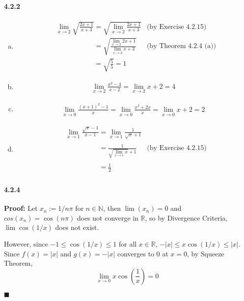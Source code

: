 \documentclass[11pt]{article}
\newcommand{\qed}{
	\begin{flushright}
		$\blacksquare$
	\end{flushright}}
\begin{document}
	\paragraph{4.2.2}
		\begin{enumerate}[(a)]
			\item 
			\begin{align}
				&\lim_{x \rightarrow 2} \sqrt{\frac{2x + 1}{x + 3}} = \sqrt{\lim_{x \rightarrow 2} \frac{2x+1}{x+3}} & \text{(by Exercise 4.2.15)}\nonumber\\
				&\phantom{\lim_{x \rightarrow 2} \sqrt{\frac{2x + 1}{x + 3}}} = \sqrt{\frac{\lim_{x \rightarrow 2} 2x + 1}{\lim_{x \rightarrow 2} x + 3}} & \text{(by Theorem 4.2.4 (a))}\nonumber\\
				&\phantom{\lim_{x \rightarrow 2} \sqrt{\frac{2x + 1}{x + 3}}} = \sqrt{\frac{5}{5}} = 1\nonumber
			\end{align}
			\item
			\begin{align}
				\lim_{x \rightarrow 2} \frac{x^2 - 4}{x - 2} = \lim_{x \rightarrow 2} x + 2 = 4 \nonumber
			\end{align}
			\item
			\begin{align}
				\lim_{x\rightarrow 0} \frac{(x + 1)^2 - 1}{x} = \lim_{x\rightarrow 0} \frac{x^2 + 2x}{x} = \lim_{x\rightarrow 0} x + 2 = 2 \nonumber
			\end{align}
			\item
			\begin{align}
				&\lim_{x\rightarrow 1} \frac{\sqrt{x} - 1}{x - 1} = \lim_{x\rightarrow 1}\frac{1}{\sqrt{x} + 1}\nonumber\\
				&\phantom{\lim_{x\rightarrow 1} \frac{\sqrt{x} - 1}{x - 1}} = \frac{1}{\sqrt{\lim_{x \rightarrow 1}x} + 1} &\text{(by Exercise 4.2.15)}\nonumber\\
				&\phantom{\lim_{x\rightarrow 1} \frac{\sqrt{x} - 1}{x - 1}} = \frac{1}{2}\nonumber
			\end{align}
		\end{enumerate}
	\paragraph{4.2.4}\textbf{Proof:}
		Let $x_n := 1/n\pi$ for $n \in \mathbb{N}$, then $\lim (x_n) = 0$ and $cos(x_n) = \cos(n\pi)$ does not converge in $\mathbb{R}$, so by Divergence Criteria, $\lim \cos(1/x)$ does not exist.
		
		However, since $-1 \leq \cos(1/x) \leq 1$ for all $x \in \mathbb{R}$, $-|x| \leq x\cos(1/x) \leq |x|$. Since $f(x) = |x|$ and $g(x) = -|x|$ converges to $0$ at $x = 0$, by Squeeze Theorem, 
			\[\lim_{x \rightarrow 0} x\cos(\frac{1}{x}) = 0\]
			\qed
\end{document}

